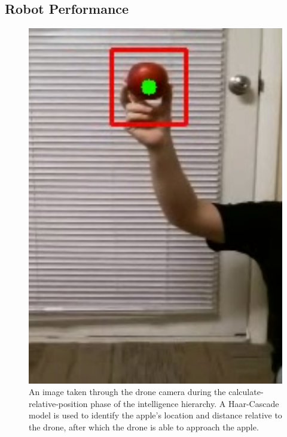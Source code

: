 \subsection{Robot Performance}\label{subsec:robot-performance}
\begin{figure}[!htb]
    \centering
    \includegraphics[width=\columnwidth,keepaspectratio]
    {./figures/haar-cascade-detection}
    \caption{
        An image taken through the drone camera during the calculate-relative-position phase of the intelligence hierarchy.
        A Haar-Cascade model is used to identify the apple's location and distance relative to the drone, after which the drone is able to approach the apple.
    }
    \label{fig:drone-haar-cascade}
\end{figure}

